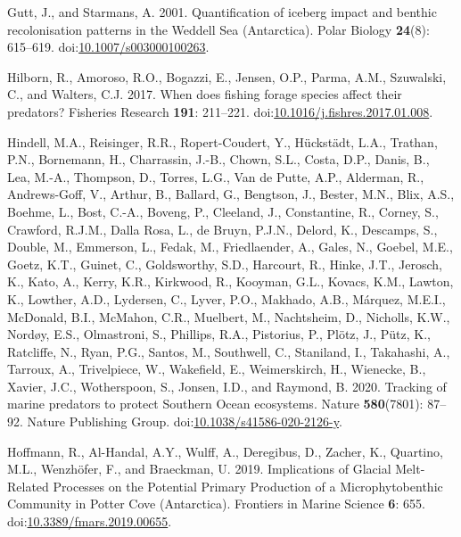 \documentclass[
]{article}
\newlength{\cslhangindent}
\newenvironment{CSLReferences}[2] %
 {\begin{list}{}{%
  \setlength{\itemindent}{0pt}
  \setlength{\leftmargin}{0pt}
  \setlength{\parsep}{0pt}
  \ifodd #1
   \setlength{\leftmargin}{\cslhangindent}
   \setlength{\itemindent}{-1\cslhangindent}
  \fi
  \setlength{\itemsep}{#2\baselineskip}}}
 {\end{list}}
\begin{document}
\begin{CSLReferences}{1}{0}
Gutt, J., and Starmans, A. 2001. Quantification of iceberg impact and
benthic recolonisation patterns in the {Weddell Sea} ({Antarctica}).
Polar Biology \textbf{24}(8): 615--619.
doi:\href{https://doi.org/10.1007/s003000100263}{10.1007/s003000100263}.

Hilborn, R., Amoroso, R.O., Bogazzi, E., Jensen, O.P., Parma, A.M.,
Szuwalski, C., and Walters, C.J. 2017. When does fishing forage species
affect their predators? Fisheries Research \textbf{191}: 211--221.
doi:\href{https://doi.org/10.1016/j.fishres.2017.01.008}{10.1016/j.fishres.2017.01.008}.

Hindell, M.A., Reisinger, R.R., Ropert-Coudert, Y., Hückstädt, L.A.,
Trathan, P.N., Bornemann, H., Charrassin, J.-B., Chown, S.L., Costa,
D.P., Danis, B., Lea, M.-A., Thompson, D., Torres, L.G., Van de Putte,
A.P., Alderman, R., Andrews-Goff, V., Arthur, B., Ballard, G., Bengtson,
J., Bester, M.N., Blix, A.S., Boehme, L., Bost, C.-A., Boveng, P.,
Cleeland, J., Constantine, R., Corney, S., Crawford, R.J.M., Dalla Rosa,
L., de Bruyn, P.J.N., Delord, K., Descamps, S., Double, M., Emmerson,
L., Fedak, M., Friedlaender, A., Gales, N., Goebel, M.E., Goetz, K.T.,
Guinet, C., Goldsworthy, S.D., Harcourt, R., Hinke, J.T., Jerosch, K.,
Kato, A., Kerry, K.R., Kirkwood, R., Kooyman, G.L., Kovacs, K.M.,
Lawton, K., Lowther, A.D., Lydersen, C., Lyver, P.O., Makhado, A.B.,
Márquez, M.E.I., McDonald, B.I., McMahon, C.R., Muelbert, M.,
Nachtsheim, D., Nicholls, K.W., Nordøy, E.S., Olmastroni, S., Phillips,
R.A., Pistorius, P., Plötz, J., Pütz, K., Ratcliffe, N., Ryan, P.G.,
Santos, M., Southwell, C., Staniland, I., Takahashi, A., Tarroux, A.,
Trivelpiece, W., Wakefield, E., Weimerskirch, H., Wienecke, B., Xavier,
J.C., Wotherspoon, S., Jonsen, I.D., and Raymond, B. 2020. Tracking of
marine predators to protect {Southern Ocean} ecosystems. Nature
\textbf{580}(7801): 87--92. Nature Publishing Group.
doi:\href{https://doi.org/10.1038/s41586-020-2126-y}{10.1038/s41586-020-2126-y}.

Hoffmann, R., Al-Handal, A.Y., Wulff, A., Deregibus, D., Zacher, K.,
Quartino, M.L., Wenzhöfer, F., and Braeckman, U. 2019. Implications of
{Glacial Melt-Related Processes} on the {Potential Primary Production}
of a {Microphytobenthic Community} in {Potter Cove} ({Antarctica}).
Frontiers in Marine Science \textbf{6}: 655.
doi:\href{https://doi.org/10.3389/fmars.2019.00655}{10.3389/fmars.2019.00655}.


\end{CSLReferences}
\end{document}

